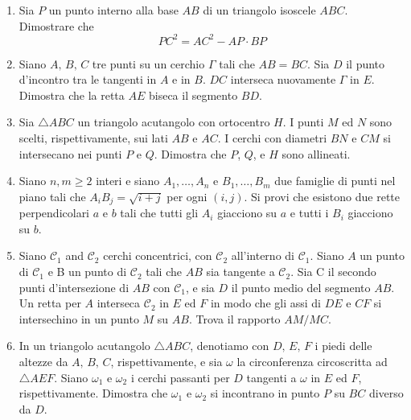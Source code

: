 \documentclass[a4paper]{article}
\theoremstyle{remark}
\theoremstyle{definition}
\begin{document}
\begin{enumerate}
	
	\item Sia $ P $ un punto interno alla base $ AB $ di un triangolo isoscele $ ABC $. Dimostrare che
	\[ PC^2 = AC^2 - AP \cdot BP \]
	
	\item Siano $ A,\, B,\, C $ tre punti su un cerchio $ \Gamma $ tali che $ AB = BC $. Sia $ D $ il punto d'incontro tra le tangenti in $ A $ e in $ B $. $ DC $ interseca nuovamente $ \Gamma $ in $ E $. Dimostra che la retta $ AE $ biseca il segmento $ BD $. \\
	
	\item Sia $ \bigtriangleup ABC $ un triangolo acutangolo con ortocentro $ H $. I punti $ M $ ed $ N $ sono scelti, rispettivamente, sui lati $ AB $ e $ AC $. I cerchi con diametri $ BN $ e $ CM $ si intersecano nei punti $ P $ e $ Q $. Dimostra che $ P $, $ Q $, e $ H $ sono allineati. \\
	
	\item Siano $ n, m \geq 2 $ interi e siano $ A_1 , \dots, A_n $ e $ B_1 , \dots , B_m $ due famiglie di punti nel piano tali che $ {A_iB_j} = \sqrt{i + j} $ per ogni $ (i, j) $. Si provi che esistono due rette perpendicolari $ a $ e $ b $ tali che tutti gli $ A_i $ giacciono su $ a $ e tutti i $ B_i $ giacciono su $ b $. \\
	
	\item Siano $ \mathcal{C}_1 $ and $ \mathcal{C}_2 $ cerchi concentrici, con $ \mathcal{C}_2 $ all'interno di $ \mathcal{C}_1 $. Siano $ A $ un punto di $ \mathcal{C}_1 $ e B un punto di $ \mathcal{C}_2 $ tali che $ AB $ sia tangente a $ \mathcal{C}_2 $. Sia C il secondo punti d'intersezione di $ AB $ con $ \mathcal{C}_1 $, e sia $ D $ il punto medio del segmento $ AB $. Un retta per $ A $ interseca $ \mathcal{C}_2 $ in $ E $ ed $ F $ in modo che gli assi di $ DE $
	e $ CF $ si intersechino in un punto $ M $ su $ AB $. Trova il rapporto $ AM/MC $. \\
	
	\item In un triangolo acutangolo $ \triangle ABC $, denotiamo con $ D,\, E,\, F $ i piedi delle altezze da $ A,\, B,\, C $, rispettivamente, e sia $ \omega $ la circonferenza circoscritta ad $\triangle AEF $. Siano $ \omega_1 $ e $ \omega_2 $ i cerchi passanti per $ D $ tangenti a $ \omega $ in $ E $ ed $ F $, rispettivamente. Dimostra che $ \omega_1 $ e $ \omega_2 $ si incontrano in punto $ P $ su $ BC $ diverso da $ D $. \\
	
\end{enumerate}
\end{document}
